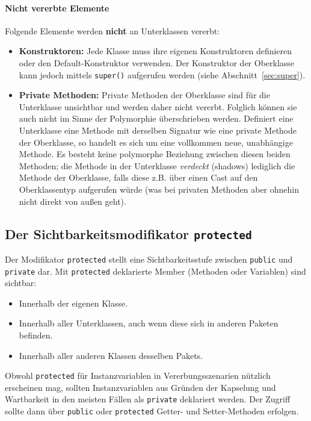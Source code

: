\paragraph{Nicht vererbte Elemente}
Folgende Elemente werden \textbf{nicht} an Unterklassen vererbt:
\begin{itemize}
    \item \textbf{Konstruktoren:} Jede Klasse muss ihre eigenen Konstruktoren definieren oder den Default-Konstruktor verwenden. Der Konstruktor 
    der Oberklasse kann jedoch mittels \texttt{super()} aufgerufen werden (siehe Abschnitt~\ref{sec:super}).
    \item \textbf{Private Methoden:} Private Methoden der Oberklasse sind für die Unterklasse unsichtbar und werden daher nicht vererbt. Folglich 
    können sie auch nicht im Sinne der Polymorphie überschrieben werden. Definiert eine Unterklasse eine Methode mit derselben Signatur wie eine 
    private Methode der Oberklasse, so handelt es sich um eine vollkommen neue, unabhängige Methode. Es besteht keine polymorphe Beziehung zwischen 
    diesen beiden Methoden; die Methode in der Unterklasse \textit{verdeckt} (shadows) lediglich die Methode der Oberklasse, falls diese z.B. über 
    einen Cast auf den Oberklassentyp aufgerufen würde (was bei privaten Methoden aber ohnehin nicht direkt von außen geht).
\end{itemize}

\subsection{Der Sichtbarkeitsmodifikator \texttt{protected}}
\label{ssec:protected}

Der Modifikator \texttt{protected} stellt eine Sichtbarkeitsstufe zwischen \texttt{public} und \texttt{private} dar. Mit \texttt{protected} deklarierte 
Member (Methoden oder Variablen) sind sichtbar:
\begin{itemize}
    \item Innerhalb der eigenen Klasse.
    \item Innerhalb aller Unterklassen, auch wenn diese sich in anderen Paketen befinden.
    \item Innerhalb aller anderen Klassen desselben Pakets.
\end{itemize}
Obwohl \texttt{protected} für Instanzvariablen in Vererbungsszenarien nützlich erscheinen mag, sollten Instanzvariablen aus Gründen der Kapselung 
und Wartbarkeit in den meisten Fällen als \texttt{private} deklariert werden. Der Zugriff sollte dann über \texttt{public} oder \texttt{protected} 
Getter- und Setter-Methoden erfolgen.

